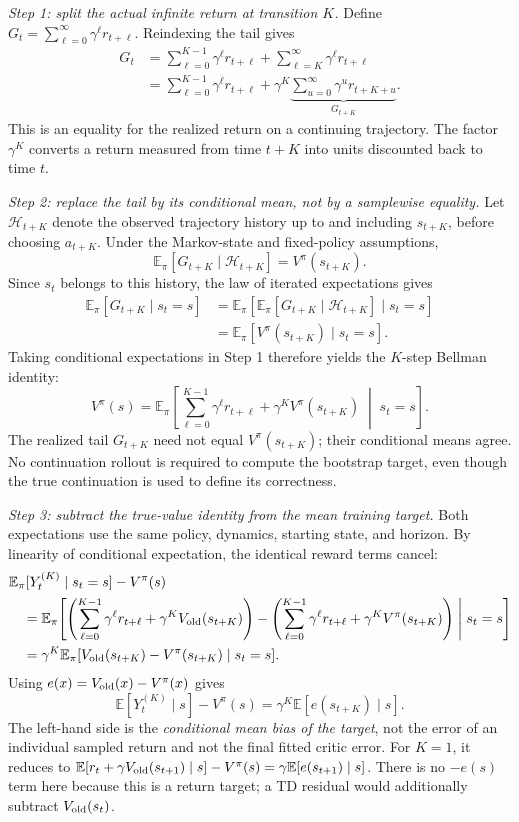 \documentclass[11pt,a4paper]{article}
\numberwithin{equation}{section}
\newcommand{\E}{\mathbb E}
\begin{document}
\emph{Step 1: split the actual infinite return at transition $K$.}
Define $G_t=\sum_{\ell=0}^{\infty}\gamma^\ell r_{t+\ell}$. Reindexing the tail gives
\begin{align*}
 G_t
 &=\sum_{\ell=0}^{K-1}\gamma^\ell r_{t+\ell}
   +\sum_{\ell=K}^{\infty}\gamma^\ell r_{t+\ell}\\
 &=\sum_{\ell=0}^{K-1}\gamma^\ell r_{t+\ell}
   +\gamma^K\underbrace{\sum_{u=0}^{\infty}\gamma^u r_{t+K+u}}_{G_{t+K}}.
\end{align*}
This is an equality for the realized return on a continuing trajectory. The
factor $\gamma^K$ converts a return measured from time $t+K$ into units discounted
back to time $t$.

\emph{Step 2: replace the tail by its conditional mean, not by a samplewise
equality.} Let $\mathcal H_{t+K}$ denote the observed trajectory history up to and
including $s_{t+K}$, before choosing $a_{t+K}$. Under the Markov-state and
fixed-policy assumptions,
\[
 \E_\pi[G_{t+K}\mid\mathcal H_{t+K}]=V^\pi(s_{t+K}).
\]
Since $s_t$ belongs to this history, the law of iterated expectations gives
\begin{align*}
 \E_\pi[G_{t+K}\mid s_t=s]
 &=\E_\pi\!\left[
     \E_\pi[G_{t+K}\mid\mathcal H_{t+K}]
     \mid s_t=s\right]\\
 &=\E_\pi[V^\pi(s_{t+K})\mid s_t=s].
\end{align*}
Taking conditional expectations in Step 1 therefore yields the $K$-step Bellman
identity:
\[
 V^\pi(s)=
 \E_\pi\!\left[\sum_{\ell=0}^{K-1}\gamma^\ell r_{t+\ell}
       +\gamma^K V^\pi(s_{t+K})\;\middle|\;s_t=s\right].
\]
The realized tail $G_{t+K}$ need not equal $V^\pi(s_{t+K})$; their conditional
means agree. No continuation rollout is required to compute the bootstrap
target, even though the true continuation is used to define its correctness.

\emph{Step 3: subtract the true-value identity from the mean training target.}
Both expectations use the same policy, dynamics, starting state, and horizon.
By linearity of conditional expectation, the identical reward terms cancel:
\begin{align*}
 &\E_\pi[Y_t^{(K)}\mid s_t=s]-V^\pi(s)\\
 &\quad=\E_\pi\!\left[
   \left(\sum_{\ell=0}^{K-1}\gamma^\ell r_{t+\ell}
       +\gamma^K V_{\rm old}(s_{t+K})\right)
   -\left(\sum_{\ell=0}^{K-1}\gamma^\ell r_{t+\ell}
       +\gamma^K V^\pi(s_{t+K})\right)
   \;\middle|\;s_t=s\right]\\
 &\quad=\gamma^K\E_\pi[
   V_{\rm old}(s_{t+K})-V^\pi(s_{t+K})\mid s_t=s].
\end{align*}
Using $e(x)=V_{\rm old}(x)-V^\pi(x)$ gives
\begin{equation}\label{eq:nstep}
 \E[Y_t^{(K)}\mid s]-V^\pi(s)
 =\gamma^K\E[e(s_{t+K})\mid s].
\end{equation}
The left-hand side is the \emph{conditional mean bias of the target}, not the
error of an individual sampled return and not the final fitted critic error.
For $K=1$, it reduces to
$\E[r_t+\gamma V_{\rm old}(s_{t+1})\mid s]-V^\pi(s)
=\gamma\E[e(s_{t+1})\mid s]$.
There is no $-e(s)$ term here because this is a return target; a TD residual
would additionally subtract $V_{\rm old}(s_t)$.
\end{document}

